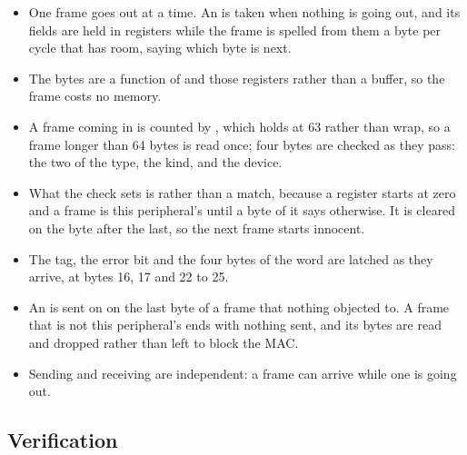 \begin{itemize}
\item One frame goes out at a time. An  is taken when
nothing is going out, and its fields are held in registers while the
frame is spelled from them a byte per cycle that  has room,
 saying which byte is next.
\item The bytes are a function of  and those registers
rather than a buffer, so the frame costs no memory.
\item A frame coming in is counted by , which holds at 63
rather than wrap, so a frame longer than 64 bytes is read once; four
bytes are checked as they pass: the two of the type, the kind, and the device.
\item What the check sets is  rather than a match, because
a register starts at zero and a frame is this peripheral's until a
byte of it says otherwise. It is cleared on the byte after the last,
so the next frame starts innocent.
\item The tag, the error bit and the four bytes of the word are
latched as they arrive, at bytes 16, 17 and 22 to 25.
\item An  is sent on  on the last byte of a
frame that nothing objected to. A frame that is not this
peripheral's ends with nothing sent, and its bytes are read and
dropped rather than left to block the MAC.
\item Sending and receiving are independent: a frame can arrive while
one is going out.
\end{itemize}

\subsection*{Verification}

